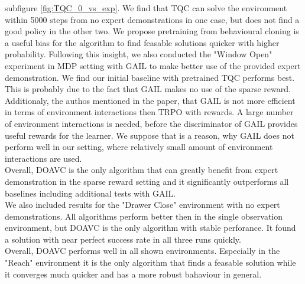 subfigure \ref{fig:TQC_0_vs_exp}. We find that TQC can solve the environment within 5000 steps from no expert demonstrations in one case, but does not find a good policy in the other two. 
We propose pretraining from behavioural cloning is a useful bias for the algorithm to find feasable solutions quicker with higher probability. Following this insight, 
we also conducted the "Window Open" experiment in MDP setting with GAIL to make better use of the provided expert demonstration. We find our initial 
baseline with pretrained TQC performs best. This is probably due to the fact that GAIL makes no use of the sparse reward. Additionaly, 
the authos mentioned in the paper, that GAIL is not more efficient in terms of environment interactions then TRPO with rewards. A large number of 
environment interactions is needed, before the discriminator of GAIL provides useful rewards for the learner. We suppose that is a reason, why GAIL does not perform 
well in our setting, where relatively small amount of environment interactions are used. \\

Overall, DOAVC is the only algorithm that can greatly benefit from expert demonstration in the sparse reward setting and 
it significantly outperforms all baselines including additional tests with GAIL. \\

We also included results for the "Drawer Close" environment with no expert demonstrations. All algorithms perform better then in the single observation environment, 
but DOAVC is the only algorithm with stable perforance. It found a solution with near perfect success rate in all three runs quickly. \\
Overall, DOAVC performs well in all shown environments. Especially in the "Reach" environment it is the only algorithm that finds a feasable solution while it 
converges much quicker and has a more robust bahaviour in general. 

